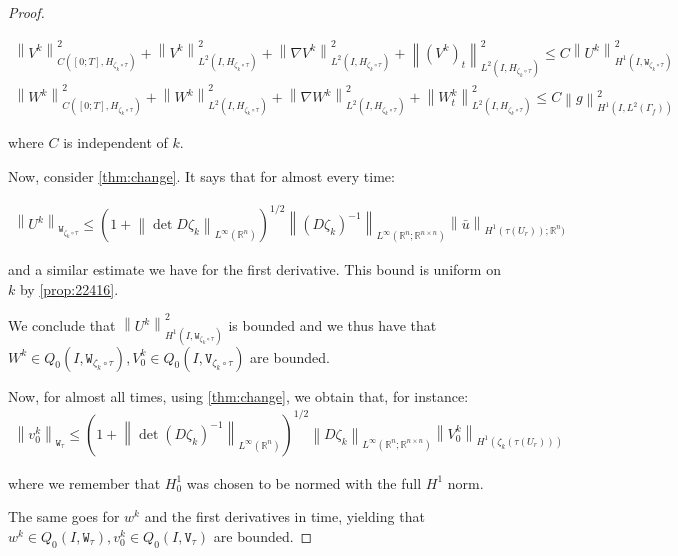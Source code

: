 \documentclass[english,a4paper,9pt,oneside]{scrbook}	%
\theoremstyle{break}
\newenvironment{mproof}[1][\proofname]{%
  \begin{proof}[#1]$ $\par\nobreak\ignorespaces
}{%
  \end{proof}
}
\renewcommand*{\proofname}{Proof}
\theoremstyle{remark}
\newcommand{\mR}{\mathbb{R}}
\newcommand{\norm}[1]{\left\lVert#1\right\rVert}
\newcommand{\tw}[1]{\texttt{#1}}
\begin{document}
\begin{mproof}
\begin{align*}
\norm{V^k}^2_{C([0;T],H_{\zeta_k\circ \tau})}+\norm{V^k}_{L^2(I,H_{\zeta_k\circ \tau})}^2+ \norm{\nabla V^k}_{L^2(I,H_{\zeta_k\circ \tau})}^2 + \norm{(V^k)_t}^2_{L^2(I,H_{\zeta_k\circ \tau})}\leq C\norm{U^k}_{H^1(I,\tw{W}_{\zeta_k\circ \tau})}^2\\
\norm{W^k}^2_{C([0;T],H_{\zeta_k\circ \tau})}+\norm{W^k}_{L^2(I,H_{\zeta_k\circ \tau})}^2+ \norm{\nabla W^k}_{L^2(I,H_{\zeta_k\circ \tau})}^2 + \norm{W^k_t}^2_{L^2(I,H_{\zeta_k\circ \tau})}\leq C\norm{g}_{H^1(I,L^2(\Gamma_f))}^2
\end{align*}


where $C$ is independent of $k$.


Now, consider \cref{thm:change}. It says that for almost every time:

\begin{align*}
\norm{U^k}_{\tw{W}_{\zeta_k\circ \tau}}\leq \left ( 1+\norm{\det D\zeta_k}_{L^\infty(\mR^n)}\right)^{1/2} \norm{(D\zeta_k)^{-1}}_{L^\infty(\mR^n;\mR^{n\times n})}\norm{\bar{u}}_{H^1(\tau(U_r));\mR^n)}
\end{align*}

and a similar estimate we have for the first derivative. This bound is uniform on $k$ by \cref{prop:22416}.

We conclude that $\norm{U^k}_{H^1(I,\tw{W}_{\zeta_k\circ \tau})}^2$ is bounded and we thus have that $W^k \in Q_0(I, \tw{W}_{\zeta_k\circ \tau}), V_0^k \in Q_0(I,\tw{V}_{\zeta_k\circ \tau})$ are bounded.

Now, for almost all times, using \cref{thm:change}, we obtain that, for instance:
\begin{align*}
\norm{v_0^k}_{\tw{W}_{ \tau}}\leq \left ( 1+\norm{\det (D\zeta_k)^{-1}}_{L^\infty(\mR^n)}\right)^{1/2} \norm{D\zeta_k}_{L^\infty(\mR^n;\mR^{n\times n})}\norm{V_0^k}_{H^1(\zeta_k(\tau(U_r)))}
\end{align*}

where we remember that $H^1_0$ was chosen to be normed with the full $H^1$ norm.

The same goes for $w^k$ and the first derivatives in time, yielding that $w^k \in Q_0(I, \tw{W}_{ \tau}), v_0^k \in Q_0(I,\tw{V}_{\tau})$ are bounded.


\end{mproof}
\end{document}
